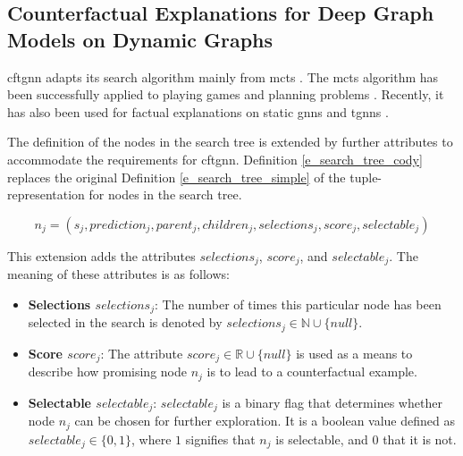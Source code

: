 \subsection{Counterfactual Explanations for Deep Graph Models on Dynamic Graphs}
\label{s_Methodology_CoDy}
\acrfull{cftgnn} adapts its search algorithm mainly from \gls{mcts} \cite{kocsis_bandit_2006, silver_mastering_2017}. The \gls{mcts} algorithm has been successfully applied to playing games \cite{silver_mastering_2017} and planning problems \cite{browne_survey_2012}. Recently, it has also been used for factual explanations on static \glspl{gnn} \cite{yuan_explainability_2021, zhang_gstarx_2022} and \glspl{tgnn} \cite{xia_explaining_2023}. 

The definition of the nodes in the search tree is extended by further attributes to accommodate the requirements for \gls{cftgnn}. Definition \ref{e_search_tree_cody} replaces the original Definition \ref{e_search_tree_simple} of the tuple-representation for nodes in the search tree.

\begin{equation}
    \label{e_search_tree_cody}
    n_j = (s_j, prediction_j, parent_j, children_j, selections_j, score_j, selectable_j)
\end{equation}

This extension adds the attributes $selections_j$, $score_j$, and $selectable_j$. The meaning of these attributes is as follows:

\begin{itemize}
    \item \textbf{Selections $selections_j$}: The number of times this particular node has been selected in the search is denoted by $selections_j \in \mathbb{N} \cup \{null\}$.

    \item \textbf{Score $score_j$}: The attribute $score_j \in \mathbb{R} \cup \{null\}$ is used as a means to describe how promising node $n_j$ is to lead to a counterfactual example.

    \item \textbf{Selectable $selectable_j$}: $selectable_j$ is a binary flag that determines whether node $n_j$ can be chosen for further exploration. It is a boolean value defined as $selectable_j \in \{0, 1\}$, where $1$ signifies that $n_j$ is selectable, and $0$ that it is not.
\end{itemize}


